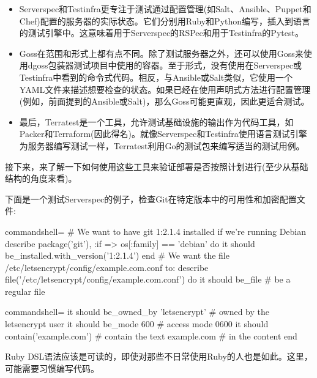 \begin{itemize}
\item 
Serverspec和Testinfra更专注于测试通过配置管理(如Salt、Ansible、Puppet和Chef)配置的服务器的实际状态。它们分别用Ruby和Python编写，插入到语言的测试引擎中。这意味着用于Serverspec的RSPec和用于Testinfra的Pytest。

\item 
Goss在范围和形式上都有点不同。除了测试服务器之外，还可以使用Goss来使用dgoss包装器测试项目中使用的容器。至于形式，没有使用在Serverspec或Testinfra中看到的命令式代码。相反，与Ansible或Salt类似，它使用一个YAML文件来描述想要检查的状态。如果已经在使用声明式方法进行配置管理(例如，前面提到的Ansible或Salt)，那么Goss可能更直观，因此更适合测试。

\item 
最后，Terratest是一个工具，允许测试基础设施的输出作为代码工具，如Packer和Terraform(因此得名)。就像Serverspec和Testinfra使用语言测试引擎为服务器编写测试一样，Terratest利用Go的测试包来编写适当的测试用例。
\end{itemize}

接下来，来了解一下如何使用这些工具来验证部署是否按照计划进行(至少从基础结构的角度来看)。


下面是一个测试Serverspec的例子，检查Git在特定版本中的可用性和加密配置文件:

\begin{tcblisting}{commandshell={}}
# We want to have git 1:2.1.4 installed if we're running Debian
describe package('git'), :if => os[:family] == 'debian' do
  it { should be_installed.with_version('1:2.1.4') }
end
# We want the file /etc/letsencrypt/config/example.com.conf to:
describe file('/etc/letsencrypt/config/example.com.conf') do
  it { should be_file } # be a regular file
\end{tcblisting}
\begin{tcblisting}{commandshell={}}
  it { should be_owned_by 'letsencrypt' } # owned by the letsencrypt user
  it { should be_mode 600 } # access mode 0600
  it { should contain('example.com') } # contain the text example.com
                                     # in the content
end
\end{tcblisting}

Ruby DSL语法应该是可读的，即使对那些不日常使用Ruby的人也是如此。这里，可能需要习惯编写代码。


